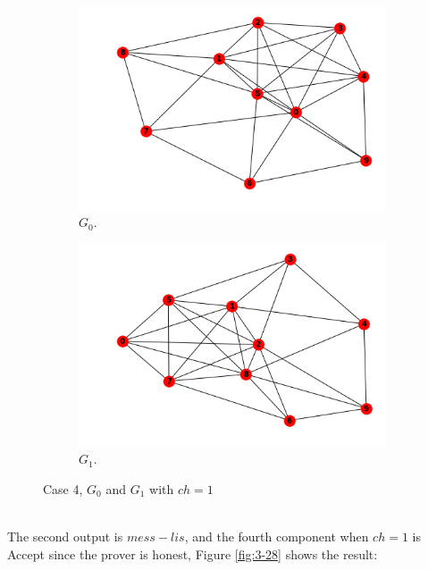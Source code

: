 \documentclass[12pt,a4paper]{article}
\begin{document}
\begin{itemize}
\\
\\
\\
\\
\\
\begin{figure}[h!]
	\centering\begin{subfigure}[b]{.45\linewidth}
		\includegraphics[width=\linewidth]{3-26.png}
		\caption{$G_0$.}
	\end{subfigure}
	\begin{subfigure}[b]{.45\linewidth}
		\includegraphics[width=\linewidth]{3-27.png}
		\caption{$G_1$.}
	\end{subfigure}
	\caption{Case 4, $G_0$ and $G_1$ with $ch=1$}
	\label{fig:case 4,$G_0$ and $G_1$, with $ch=1$}
\end{figure}\\
The second output is $mess-lis$, and the fourth component when $ch=1$ is Accept since the prover is honest, Figure \ref{fig:3-28} shows the result:\\

\end{itemize}
\end{document}
